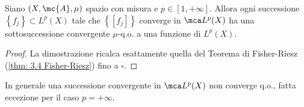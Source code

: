 \begin{proposition}[$\circ$]
    Siano $(X, \mc{A}, \mu)$ spazio con misura e $p \in[1,+\infty]$. Allora ogni successione $\left\{f_{j}\right\} \subset L^{p}(X)$ tale che $\left\{\left[f_{j}\right]\right\}$ converge in $\mca L^{p}(X)$ ha una sottosuccessione convergente $\mu$-q.o. a una funzione di $L^{p}(X)$.
\end{proposition}
\begin{proof}
    La dimostrazione ricalca esattamente quella del Teorema di Fisher-Riesz (\ref{thm: 3.4 Fisher-Riesz}) fino a $\square$.
\end{proof}

\begin{oss}
    In generale una successione convergente in $\mca L^{p}(X)$ non converge q.o., fatta eccezione per il caso $p=+\infty$.
\end{oss}
